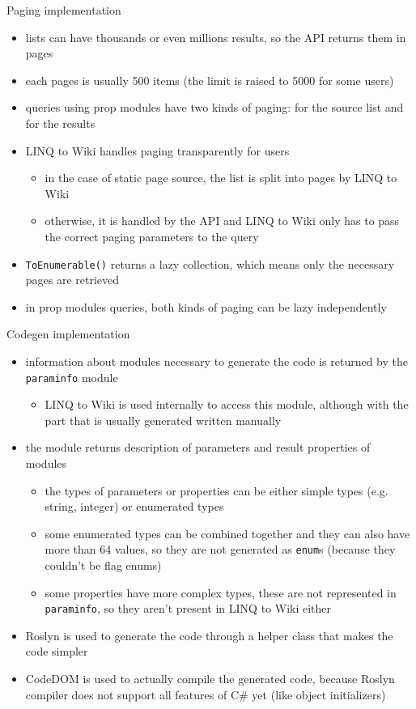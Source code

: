 \documentclass{beamer}
\begin{document}
\begin{frame}{Paging implementation}
\begin{itemize}
\item lists can have thousands or even millions results, so the API returns them in pages
\item each pages is usually 500 items (the limit is raised to 5000 for some users)
\item queries using prop modules have two kinds of paging: for the source list and for the results
\item LINQ to Wiki handles paging transparently for users
\begin{itemize}
\item in the case of static page source, the list is split into pages by LINQ to Wiki
\item otherwise, it is handled by the API and LINQ to Wiki only has to pass the correct paging parameters to the query
\end{itemize}
\item \lstinline{ToEnumerable()} returns a lazy collection, which means only the necessary pages are retrieved
\item in prop modules queries, both kinds of paging can be lazy independently
\end{itemize}
\end{frame}

\begin{frame}{Codegen implementation}
\begin{itemize}
\item information about modules necessary to generate the code is returned by the \texttt{paraminfo} module
\begin{itemize}
\item LINQ to Wiki is used internally to access this module, although with the part that is usually generated written manually
\end{itemize}
\item the module returns description of parameters and result properties of modules
\begin{itemize}
\item the types of parameters or properties can be either simple types (e.g. string, integer) or enumerated types
\item some enumerated types can be combined together and they can also have more than 64 values, so they are not generated as \lstinline{enum}s (because they couldn't be flag enums)
\item some properties have more complex types, these are not represented in \lstinline{paraminfo}, so they aren't present in LINQ to Wiki either
\end{itemize}
\item Roslyn is used to generate the code through a helper class that makes the code simpler
\item CodeDOM is used to actually compile the generated code, because Roslyn compiler does not support all features of C\# yet (like object initializers)
\end{itemize}
\end{frame}
\end{document}
